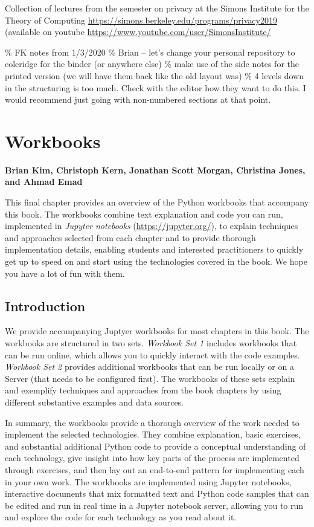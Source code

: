 \documentclass[]{krantz}
\begin{document}
Collection of lectures from the semester on privacy at the Simons
Institute for the Theory of Computing
\url{https://simons.berkeley.edu/programs/privacy2019} (available on
youtube \url{https://www.youtube.com/user/SimonsInstitute/}

\% FK notes from 1/3/2020 \% Brian -- let's change your personal
repository to coleridge for the binder (or anywhere else) \% make use of
the side notes for the printed version (we will have them back like the
old layout was) \% 4 levels down in the structuring is too much. Check
with the editor how they want to do this. I would recommend just going
with non-numbered sections at that point.

\hypertarget{chap:workbooks}{\chapter{Workbooks}\label{chap:workbooks}}

\textbf{Brian Kim, Christoph Kern, Jonathan Scott Morgan, Christina
Jones, and Ahmad Emad}

This final chapter provides an overview of the Python workbooks that
accompany this book. The workbooks combine text explanation and code you
can run, implemented in \emph{Jupyter notebooks}
(\url{https://jupyter.org/}), to explain techniques and approaches
selected from each chapter and to provide thorough implementation
details, enabling students and interested practitioners to quickly get
up to speed on and start using the technologies covered in the book. We
hope you have a lot of fun with them.

\section{Introduction}\label{introduction-6}

We provide accompanying Juptyer workbooks for most chapters in this
book. The workbooks are structured in two sets. \emph{Workbook Set 1}
includes workbooks that can be run online, which allows you to quickly
interact with the code examples. \emph{Workbook Set 2} provides
additional workbooks that can be run locally or on a Server (that needs
to be configured first). The workbooks of these sets explain and
exemplify techniques and approaches from the book chapters by using
different substantive examples and data sources.

In summary, the workbooks provide a thorough overview of the work needed
to implement the selected technologies. They combine explanation, basic
exercises, and substantial additional Python code to provide a
conceptual understanding of each technology, give insight into how key
parts of the process are implemented through exercises, and then lay out
an end-to-end pattern for implementing each in your own work. The
workbooks are implemented using Jupyter notebooks, interactive documents
that mix formatted text and Python code samples that can be edited and
run in real time in a Jupyter notebook server, allowing you to run and
explore the code for each technology as you read about it.
\end{document}
